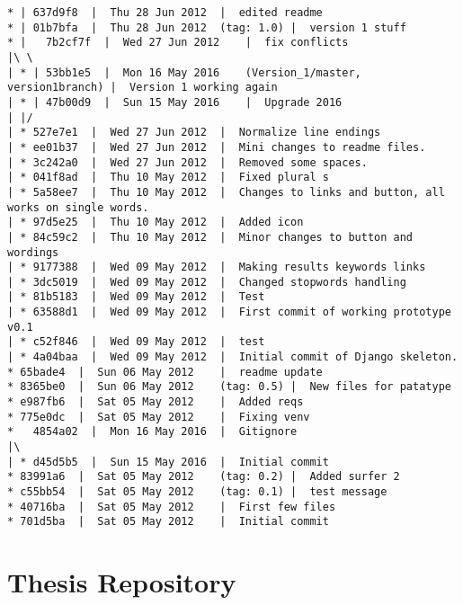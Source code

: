 \begin{verbatim}
* | 637d9f8  |  Thu 28 Jun 2012	 |  edited readme
* | 01b7bfa  |  Thu 28 Jun 2012	 (tag: 1.0) |  version 1 stuff
* |   7b2cf7f  |  Wed 27 Jun 2012	 |  fix conflicts
|\ \  
| * | 53bb1e5  |  Mon 16 May 2016	 (Version_1/master, version1branch) |  Version 1 working again
| * | 47b00d9  |  Sun 15 May 2016	 |  Upgrade 2016
| |/  
| * 527e7e1  |  Wed 27 Jun 2012	 |  Normalize line endings
| * ee01b37  |  Wed 27 Jun 2012	 |  Mini changes to readme files.
| * 3c242a0  |  Wed 27 Jun 2012	 |  Removed some spaces.
| * 041f8ad  |  Thu 10 May 2012	 |  Fixed plural s
| * 5a58ee7  |  Thu 10 May 2012	 |  Changes to links and button, all works on single words.
| * 97d5e25  |  Thu 10 May 2012	 |  Added icon
| * 84c59c2  |  Thu 10 May 2012	 |  Minor changes to button and wordings
| * 9177388  |  Wed 09 May 2012	 |  Making results keywords links
| * 3dc5019  |  Wed 09 May 2012	 |  Changed stopwords handling
| * 81b5183  |  Wed 09 May 2012	 |  Test
| * 63588d1  |  Wed 09 May 2012	 |  First commit of working prototype v0.1
| * c52f846  |  Wed 09 May 2012	 |  test
| * 4a04baa  |  Wed 09 May 2012	 |  Initial commit of Django skeleton.
* 65bade4  |  Sun 06 May 2012	 |  readme update
* 8365be0  |  Sun 06 May 2012	 (tag: 0.5) |  New files for patatype
* e987fb6  |  Sat 05 May 2012	 |  Added reqs
* 775e0dc  |  Sat 05 May 2012	 |  Fixing venv
*   4854a02  |  Mon 16 May 2016	 |  Gitignore
|\  
| * d45d5b5  |  Sun 15 May 2016	 |  Initial commit
* 83991a6  |  Sat 05 May 2012	 (tag: 0.2) |  Added surfer 2
* c55bb54  |  Sat 05 May 2012	 (tag: 0.1) |  test message
* 40716ba  |  Sat 05 May 2012	 |  First few files
* 701d5ba  |  Sat 05 May 2012	 |  Initial commit
\end{verbatim}


\section{Thesis Repository}

